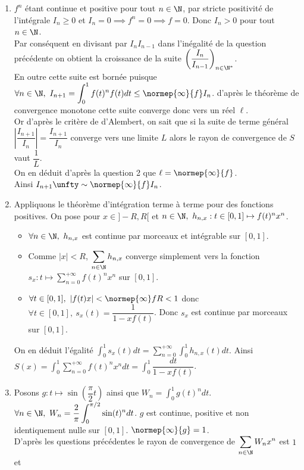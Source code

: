 \documentclass{book}
\begin{document}
\begin{enumerate}[leftmargin=*]
		\item $f^n$ étant continue et positive pour tout $n\in \N$, par stricte positivité de l'intégrale $I_n\geq 0$ et $I_n=0\implies f^n=0\implies f=0$. Donc $I_n>0$ pour tout $n\in \N$.\\
		Par conséquent en divisant par $I_nI_{n-1}$ dans l'inégalité de la question précédente on obtient la croissance de la suite $\left(\dfrac{I_n}{I_{n-1}}\right)_{n\in \N^*}$.\\
		En outre cette suite est bornée puisque $\forall n\in \N,\ I_{n+1}=\displaystyle\int_0^1f(t)^nf(t)dt\leq \normep{\infty}{f}I_n$. d'après le théorème de convergence monotone cette suite converge donc vers un réel $\ell$.\\
		Or d'après le critère de d'Alembert, on sait que si la suite de terme général $\left|\dfrac{I_{n+1}}{I_n}\right|=\dfrac{I_{n+1}}{I_n}$ converge vers une limite $L$ alors le rayon de convergence de $S$ vaut $\dfrac{1}{L}$.\\
		On en déduit d'après la question 2 que $\ell=\normep{\infty}{f}$.\\
		Ainsi $I_{n+1}\unfty\sim\normep{\infty}{f}I_n$.
		\item Appliquons le théorème d'intégration terme à terme pour des fonctions positives. On pose pour $x\in ]-R,R[$ et $n\in \N,\ h_{n,x}:t\in [0,1]\mapsto f(t)^nx^n$.
		\begin{itemize}
			\item $\forall n\in \N,\ h_{n,x}$ est continue par morceaux et intégrable sur $[0,1]$.
			\item Comme $|x|<R$, $\displaystyle\sum_{n\in \N}h_{n,x}$ converge simplement vers la fonction $s_x:t\mapsto \displaystyle\sum_{n=0}^{+\infty}f(t)^nx^n$ sur $[0,1]$.
			\item $\forall t\in [0,1],\ |f(t)x|<\normep{\infty}fR<1$ donc $\forall t\in [0,1],\ s_x(t)=\dfrac{1}{1-xf(t)}$. Donc $s_x$ est continue par morceaux sur $[0,1]$.
		\end{itemize}
		On en déduit l'égalité $\displaystyle\int_0^1s_x(t)dt=\sum_{n=0}^{+\infty}\int_0^1h_{n,x}(t)dt$. Ainsi $S(x)=\displaystyle\int_0^1\sum_{n=0}^{+\infty}f(t)^nx^ndt=\int_0^1\dfrac{dt}{1-xf(t)}$.
		\item Posons $g:t\mapsto \sin\left(\dfrac{\pi}{2}t\right)$ ainsi que $W_n=\displaystyle\int_0^1g(t)^ndt$. $\forall n\in \N,\ W_n=\displaystyle\frac{2}{\pi}\int_0^{\pi/2}\sin(t)^ndt$. $g$ est continue, positive et non identiquement nulle sur $[0,1]$. $\normep{\infty}{g}=1$.\\
		D'après les questions précédentes le rayon de convergence de $\displaystyle\sum_{n\in \N}W_nx^n$ est $1$ et

\end{enumerate}
\end{document}
